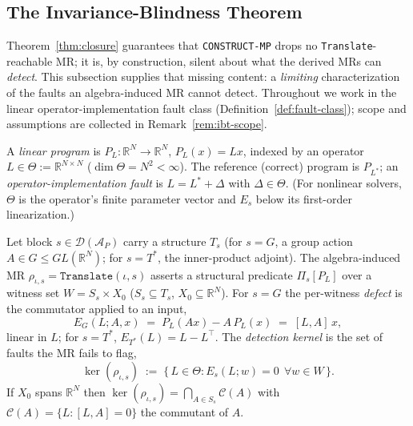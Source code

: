 
\subsection{The Invariance-Blindness Theorem}
\label{subsec:ibt}

Theorem~\ref{thm:closure} guarantees that \texttt{CONSTRUCT-MP} drops no
\texttt{Translate}-reachable MR; it is, by construction, silent about what the
derived MRs can \emph{detect}. This subsection supplies that missing content: a
\emph{limiting} characterization of the faults an algebra-induced MR cannot
detect. Throughout we work in the linear operator-implementation fault class
(Definition~\ref{def:fault-class}); scope and assumptions are collected in
Remark~\ref{rem:ibt-scope}.

\begin{definition}
\label{def:fault-class}
A \emph{linear program} is $P_L:\mathbb{R}^N\to\mathbb{R}^N$, $P_L(x)=Lx$, indexed by an
operator $L\in\Theta:=\mathbb{R}^{N\times N}$ ($\dim\Theta=N^2<\infty$). The reference
(correct) program is $P_{L^{*}}$; an \emph{operator-implementation fault} is
$L=L^{*}+\Delta$ with $\Delta\in\Theta$. (For nonlinear solvers, $\Theta$ is the
operator's finite parameter vector and $E_s$ below its first-order linearization.)
\end{definition}

\begin{definition}
\label{def:defect-kernel}
Let block $s\in\mathcal{D}(\mathcal{A}_P)$ carry a structure $T_s$ (for $s=G$, a group
action $A\in G\le GL(\mathbb{R}^N)$; for $s=T^{*}$, the inner-product adjoint). The
algebra-induced MR $\rho_{\iota,s}=\texttt{Translate}(\iota,s)$ asserts a structural
predicate $\Pi_s[P_L]$ over a witness set $W=S_s\times X_0$ ($S_s\subseteq T_s$,
$X_0\subseteq\mathbb{R}^N$). For $s=G$ the per-witness \emph{defect} is the commutator
applied to an input,
\[
E_G(L;A,x)\;=\;P_L(Ax)-A\,P_L(x)\;=\;[L,A]\,x,
\]
linear in $L$; for $s=T^{*}$, $E_{T^{*}}(L)=L-L^{\top}$. The \emph{detection kernel}
is the set of faults the MR fails to flag,
\[
\ker(\rho_{\iota,s})\;:=\;\{\,L\in\Theta : E_s(L;w)=0\ \ \forall w\in W\,\}.
\]
If $X_0$ spans $\mathbb{R}^N$ then $\ker(\rho_{\iota,s})=\bigcap_{A\in S_s}\mathcal{C}(A)$
with $\mathcal{C}(A)=\{L:[L,A]=0\}$ the commutant of $A$.
\end{definition}

